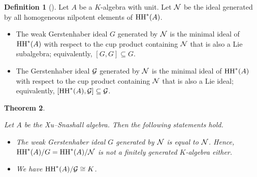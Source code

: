 \documentclass[10pt, reqno]{amsart}
\newtheorem{theorem}{Theorem}[section]
\theoremstyle{definition}
\newtheorem{definition}[theorem]{Definition}
\theoremstyle{remark}
\numberwithin{equation}{section}
\begin{document}
\begin{definition} [{\cite[Section 9.2]{Her16}}]
    Let \(A\) be a \(K\)-algebra with unit. Let \(\mathcal{N}\) be the ideal generated by all homogeneous nilpotent elements of \(\mathrm{HH}^*(A)\). 
    \begin{itemize}
        \item[(1)]   The weak Gerstenhaber ideal \(G\) generated by $\mathcal{N}$ is the minimal ideal of \(\mathrm{HH}^*(A)\) with respect to the cup product  containing $\mathcal{N}$  that is also a Lie subalgebra; equivalently, $[G,G]\subseteq G$.
        \item[(2)]  The Gerstenhaber ideal \(\mathcal{G}\) generated by $\mathcal{N}$ is the minimal ideal of \(\mathrm{HH}^*(A)\) with respect to the cup product containing $\mathcal{N}$ that is also a Lie ideal; equivalently, $[\mathrm{HH}^*(A), \mathcal{G}]\subseteq \mathcal{G}$.
    \end{itemize}
\end{definition}

 

\begin{theorem} \label{Main Theorem}

Let $A$ be the Xu--Snashall algebra. 
    Then the following statements hold.    
    \begin{itemize}
    \item[(1)] The weak Gerstenhaber ideal $G$ generated by $\mathcal{N}$ is equal to $\mathcal{N}$.  
   Hence, \(\mathrm{HH}^*(A)/G =\mathrm{HH}^*(A)/\mathcal{N}\) is not a finitely generated \(K\)-algebra either. 
   \item[(2)]  We have 
     $\mathrm{HH}^*(A)/\mathcal{G} \cong K$. 
\end{itemize}
   
\end{theorem}
\end{document}
